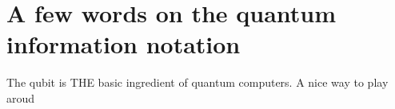 \section{A few words on the quantum information notation}

The qubit is THE basic ingredient of quantum computers. A nice way to play aroud